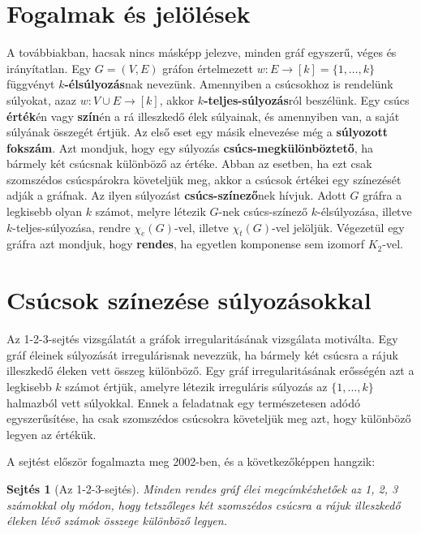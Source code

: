 \documentclass[12pt, a4paper]{report}
\newtheorem{sej}[tét]{Sejtés}
\theoremstyle{remark}
\theoremstyle{definition}
\begin{document}
\section{Fogalmak és jelölések}
A továbbiakban, hacsak nincs másképp jelezve, minden gráf egyszerű, véges és irányítatlan. Egy $G = (V, E)$ gráfon értelmezett $w: E \rightarrow [k] = \lbrace 1, \ldots, k \rbrace$ függvényt \textbf{$k$-élsúlyozás}nak nevezünk. Amennyiben a csúcsokhoz is rendelünk súlyokat, azaz $w: V \cup E \rightarrow [k]$, akkor \textbf{$k$-teljes-súlyozás}ról beszélünk. Egy csúcs \textbf{érték}én vagy \textbf{szín}én a rá illeszkedő élek súlyainak, és amennyiben van, a saját súlyának összegét értjük. Az első eset egy másik elnevezése még a \textbf{súlyozott fokszám}. Azt mondjuk, hogy egy súlyozás \textbf{csúcs-megkülönböztető}, ha bármely két csúcsnak különböző az értéke. Abban az esetben, ha ezt csak szomszédos csúcspárokra követeljük meg, akkor a csúcsok értékei egy színezését adják a gráfnak. Az ilyen súlyozást \textbf{csúcs-színező}nek hívjuk. Adott $G$ gráfra a legkisebb olyan $k$ számot, melyre létezik $G$-nek csúcs-színező $k$-élsúlyozása, illetve $k$-teljes-súlyozása, rendre $\chi_e(G)$-vel, illetve $\chi_t(G)$-vel jelöljük. Végezetül egy gráfra azt mondjuk, hogy \textbf{rendes}, ha egyetlen komponense sem izomorf $K_2$-vel.

\section{Csúcsok színezése súlyozásokkal}
Az 1-2-3-sejtés vizsgálatát a gráfok irregularitásának vizsgálata motiválta. Egy gráf éleinek súlyozását irregulárisnak nevezzük, ha bármely két csúcsra a rájuk illeszkedő éleken vett összeg különböző. Egy gráf irregularitásának erősségén azt a legkisebb $k$ számot értjük, amelyre létezik irreguláris súlyozás az $\lbrace 1, \ldots, k \rbrace$ halmazból vett súlyokkal. Ennek a feladatnak egy természetesen adódó egyszerűsítése, ha csak szomszédos csúcsokra követeljük meg azt, hogy különböző legyen az értékük. 

A sejtést először \citeauthor{Karonski2004} \cite{Karonski2004} fogalmazta meg 2002-ben, és a következőképpen hangzik: 

\begin{sej}[Az 1-2-3-sejtés]
Minden rendes gráf élei megcímkézhetőek az 1, 2, 3 számokkal oly módon, hogy tetszőleges két szomszédos csúcsra a rájuk illeszkedő éleken lévő számok összege különböző legyen.
\end{sej}
\end{document}
